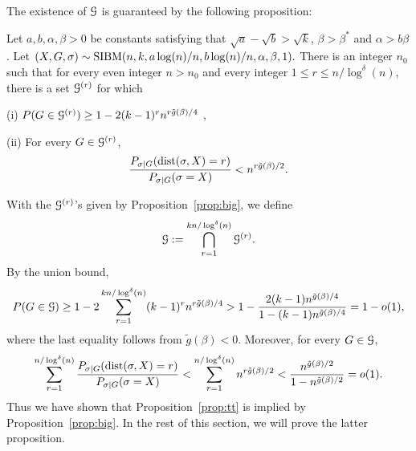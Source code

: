 \documentclass{article}
\begin{document}
The existence of $\mathcal{G}$ is guaranteed by the following proposition:
\begin{proposition} \label{prop:big}
Let $a,b,\alpha,\beta> 0$ be constants satisfying that $\sqrt{a}-\sqrt{b} > \sqrt{k}$, $\beta>\beta^\ast$ and $\alpha>b\beta$. 
Let 
$
(X,G,\sigma) \sim \operatorname{SIBM}(n,k,a\log(n)/n, b\log(n)/n,\alpha,\beta, 1) .
$
There is an integer $n_0$ such that for every even integer $n>n_0$ and  every integer $1\le r \le n/\log^{\delta}(n)$,
there is a set $\mathcal{G}^{(r)}$ for which

\noindent (i)
$P(G\in\mathcal{G}^{(r)}) \ge 1- 2(k-1)^r n^{r\tilde{g}(\beta)/4}$ ,

\noindent (ii) For every $G\in\mathcal{G}^{(r)}$,
$$
\frac{P_{\sigma|G}(\operatorname{dist}(\sigma, X)=r)}
{P_{\sigma|G}(\sigma=X)} <
n^{r \tilde{g}(\beta) /2} .
$$
\end{proposition}
With the $\mathcal{G}^{(r)}$'s given by Proposition~\ref{prop:big}, we
define 
$$
\mathcal{G}:=\bigcap_{r=1}^{kn/\log^{\delta}(n)} \mathcal{G}^{(r)} .
$$
By the union bound,
$$
P(G\in\mathcal{G})\ge 1-2 \sum_{r=1}^{kn/\log^{\delta}(n)} (k-1)^rn^{r\tilde{g}(\beta)/4}
> 1- \frac{2 (k-1)n^{\tilde{g}(\beta)/4}}{1-(k-1)n^{\tilde{g}(\beta)/4}}
=1-o(1),
$$
where the last equality follows from $\tilde{g}(\beta)<0$. Moreover, for every $G\in\mathcal{G}$,
\begin{align*}
\sum_{r=1}^{n/\log^{\delta}(n)}
\frac{P_{\sigma|G}(\operatorname{dist}(\sigma, X) = r )}
{P_{\sigma|G}(\sigma=X)}
< \sum_{r=1}^{n/\log^{\delta}(n)}
n^{r \tilde{g}(\beta) /2}
< \frac{n^{\tilde{g}(\beta)/2}}{1-n^{\tilde{g}(\beta)/2}} =o(1) .
\end{align*}
Thus we have shown that Proposition~\ref{prop:tt} is implied by Proposition~\ref{prop:big}. In the rest of this section, we will prove the latter proposition.
\end{document}
